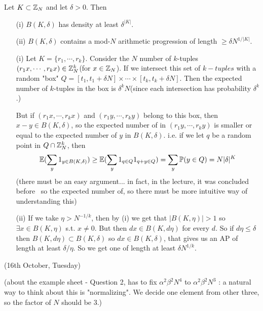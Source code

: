 \documentclass[12pt,a4paper]{report}
\newenvironment{proof}
{\begin{changemargin}{1cm}{0.5cm}
	}%
	{\end{changemargin}
}
\begin{document}
 Let $K \subset \mathbb{Z}_N$ and let $\delta >0$. Then
\begin{itemize}
\item[(i)] $B(K,\delta)$ has density at least $\delta^{|K|}$.
\item[(ii)] $B(K,\delta)$ contains a mod-$N$ arithmetic progression of length $\geq \delta N^{1/|K|}$.
\end{itemize}
\begin{proof}
\pf

\begin{itemize}
\item[(i)]Let $K = \{r_1,\cdots, r_k\}$. Consider the $N$ number of $k$-tuples $(r_1 x, \cdots, r_k x)\in \mathbb{Z}_N^k$(for $x\in \mathbb{Z}_N$). If we intersect this set of $k-tuples$ with a random "box" $Q=[t_1,t_1+\delta N] \times \cdots \times [t_k,t_k+\delta N]$. Then the expected number of $k$-tuples in the box is $\delta^k N$(since each intersection has probability $\delta^k$.)

\quad But if $(r_1 x,\cdots, r_k x)$  and $(r_1 y,\cdots, r_k y)$ belong to this box, then $x-y \in B(K,\delta)$, so the expected number of in $(r_1 y,\cdots, r_k y)$ is smaller or equal to the expected number of $y$ in $B(K,\delta)$. i.e. if we let $q$ be a random point in $Q \cap \mathbb{Z}_N^k$, then
\begin{align*}
\mathbb{E}( \sum_y 1_{y\in B(K,\delta)}) \geq \mathbb{E}(\sum_{y} 1_{q \in Q} 1_{q + y  \in Q}) = \sum_y \mathbb{P} ( y\in Q  ) = N |\delta|^{K}
\end{align*}
(there must be an easy argument... in fact, in the lecture, it was concluded before ~so the expected number of, so there must be more intuitive way of understanding this)
\item[(ii)] If we take $\eta > N^{-1/k}$, then by (i) we get that $|B(K,\eta)|>1$ so $\exists x \in B(K,\eta)$ s.t. $x\neq 0$. But then $dx \in B(K,d\eta)$ for every $d$. So if $d\eta \leq \delta$ then $B(K,d\eta) \subset B(K,\delta)$ so $dx\in B(K,\delta)$, that gives us an AP of length at least $\delta/\eta$. So we get one of length at least $\delta N^{1/k}$.
\end{itemize} 
\eop
\end{proof}
\s

\newday

(16th October, Tuesday)
\s

(about the example sheet - Question 2, has to fix $\alpha^2 \beta^2 N^4$ to $\alpha^2 \beta^2 N^3$ : a natural way to think about this is "normalizing". We decide one element from other three, so the factor of $N$ should be 3.)
\s
\end{document}
